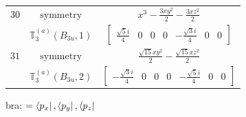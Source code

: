 \documentclass[fleqn,8pt,landscape]{jsarticle}
\begin{document}
\begin{longtable}{ccc}
$ 30 $ & $ \text{symmetry} $ & $ x^{3} - \frac{3 x y^{2}}{2} - \frac{3 x z^{2}}{2} $ \\
$  $ & $ \mathbb{T}_{3}^{(a)}(B_{3u},1) $ & $ \begin{bmatrix} \frac{\sqrt{5} i}{4} & 0 & 0 & 0 & - \frac{\sqrt{3} i}{4} & 0 & 0 \end{bmatrix} $ \\ \hline
$ 31 $ & $ \text{symmetry} $ & $ \frac{\sqrt{15} x y^{2}}{2} - \frac{\sqrt{15} x z^{2}}{2} $ \\
$  $ & $ \mathbb{T}_{3}^{(a)}(B_{3u},2) $ & $ \begin{bmatrix} - \frac{\sqrt{3} i}{4} & 0 & 0 & 0 & - \frac{\sqrt{5} i}{4} & 0 & 0 \end{bmatrix} $ \\ \hline
\end{longtable}
bra: $=\bra{p_{x}}, \bra{p_{y}}, \bra{p_{z}}$
\end{document}
